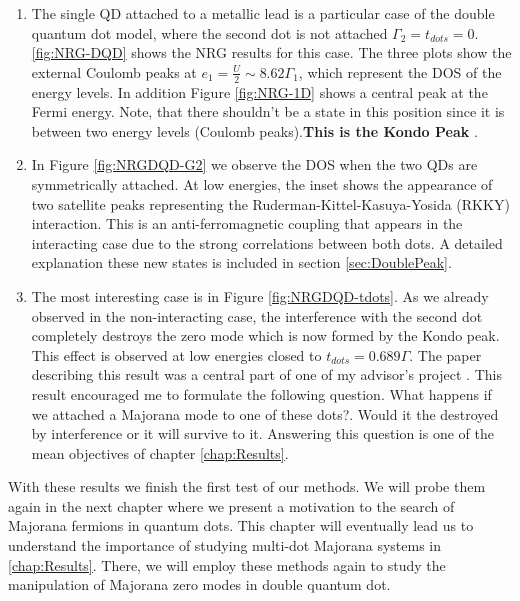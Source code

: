  \begin{enumerate}
 
\item The single QD attached to a metallic lead is a particular case of the double quantum dot model, where the second dot is not attached $\Gamma_2 = t_{dots}=0$.  \ref{fig:NRG-DQD} shows the NRG results for this case. The three plots show the external Coulomb peaks at $e_1 = \frac{U}{2} \sim 8.62\Gamma_1$, which represent the DOS of the energy levels. In addition  Figure \ref{fig:NRG-1D} shows a central peak at the Fermi energy. Note, that there shouldn't be a state in this position since it is between two energy levels (Coulomb peaks).\textbf{This is the Kondo Peak} \cite{hewson_kondo_1997}.  
\item 
In Figure \ref{fig:NRGDQD-G2} we observe the DOS when the two QDs are symmetrically attached.  At low energies, the inset shows the appearance of two satellite peaks representing the Ruderman-Kittel-Kasuya-Yosida (RKKY) interaction. This is an anti-ferromagnetic coupling that appears in the interacting case due to the strong correlations between both dots. A detailed explanation  these new states is included in section \ref{sec:DoublePeak}.  
\item The most interesting case is in Figure \ref{fig:NRGDQD-tdots}. As we already observed in the non-interacting case, the interference with the second dot completely destroys the zero mode which is now formed by the Kondo peak. This effect is observed at low energies closed to $t_{dots}=0.689\Gamma$. The paper describing this result was a central part of one of my advisor's project \cite{dias_da_silva_transmission_2008}. This result encouraged me to formulate the following question. What happens if we attached a Majorana mode to one of these dots?. Would it the destroyed by interference or it will survive to it. Answering this question is one of the mean objectives of chapter \ref{chap:Results}. 
 \end{enumerate}

With these results we finish the first test of our methods. We will probe them again in the next chapter where we present a motivation to the search of Majorana fermions in quantum dots. This chapter will eventually lead us to understand the importance of studying multi-dot Majorana systems in \ref{chap:Results}. There, we will employ these methods again to study the manipulation of  Majorana zero modes in double quantum dot. 








